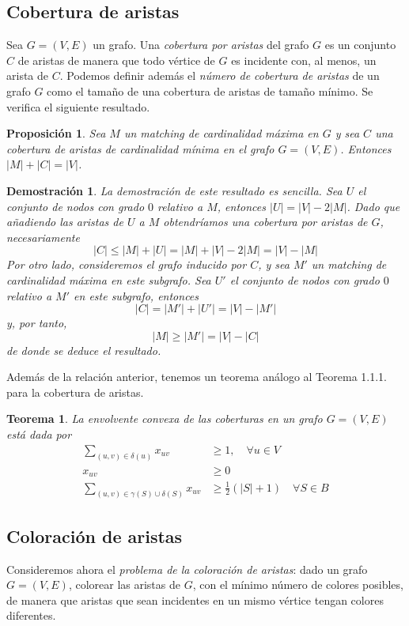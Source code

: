 \documentclass[twoside,a4paper,openright,12pt,tikz]{book}
\newtheorem{prop}{Proposici\'on}[section]
\newtheorem{thm}{Teorema}[section]
\newtheorem*{dem}{Demostración}
\begin{document}
\subsection{Cobertura de aristas}
Sea $G=(V,E)$ un grafo. Una \textit{cobertura por aristas} del grafo $G$ es un conjunto $C$ de aristas de manera que todo vértice de $G$ es incidente con, al menos, un arista de $C$. Podemos definir además el \textit{número de cobertura de aristas} de un grafo $G$ como el tamaño de una cobertura de aristas de tamaño mínimo. Se verifica el siguiente resultado.
\begin{prop}
Sea $M$ un matching de cardinalidad máxima en $G$ y sea $C$ una cobertura de aristas de cardinalidad mínima en el grafo $G=(V,E)$. Entonces $|M|+|C|=|V|$.
\end{prop}
\begin{dem}
La demostración de este resultado es sencilla. Sea $U$ el conjunto de nodos con grado $0$ relativo a $M$, entonces $|U|=|V|-2|M|$. Dado que añadiendo las aristas de $U$ a $M$ obtendríamos una cobertura por aristas de $G$, necesariamente
$$
|C| \leq |M|+|U| = |M| + |V|-2|M| = |V|-|M|
$$
Por otro lado, consideremos el grafo inducido por $C$, y sea $M'$ un matching de cardinalidad máxima en este subgrafo. Sea $U'$ el conjunto de nodos con grado $0$ relativo a $M'$ en este subgrafo, entonces
$$
|C| = |M'| +|U'| = |V|-|M'|
$$
y, por tanto,
$$
|M| \geq |M'| = |V|-|C|
$$
de donde se deduce el resultado.
\end{dem}
Además de la relación anterior, tenemos un teorema análogo al Teorema 1.1.1. para la cobertura de aristas.
\begin{thm}
La envolvente convexa de las coberturas en un grafo $G=(V,E)$ está dada por
\begin{align*}
\sum_{(u,v)\in\delta(u)} x_{uv} &\geq 1, \quad \forall u\in V\\
x_{uv} &\geq 0\\
\sum_{(u,v)\in \gamma(S)\cup\delta(S)} x_{uv}& \geq \frac{1}{2}(|S|+1)\quad \forall S \in B	
\end{align*}
\end{thm}


\subsection{Coloración de aristas}
Consideremos ahora el \textit{problema de la coloración de aristas}: dado un grafo $G=(V,E)$, colorear las aristas de $G$, con el mínimo número de colores posibles, de manera que aristas que sean incidentes en un mismo vértice tengan colores diferentes. 
\end{document}
